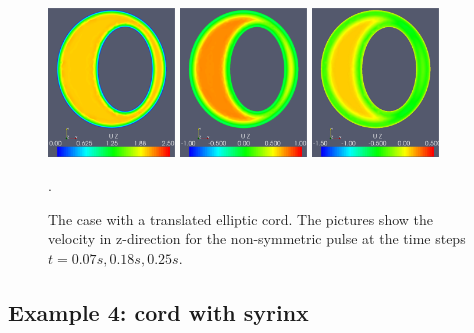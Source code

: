 \begin{figure}\begin{center}
\includegraphics[width=0.3\textwidth]{chapters/hentschel/pdf/pulse_f1_08_elliptic_eccentric_sysmax_nmb7.pdf}
\includegraphics[width=0.3\textwidth]{chapters/hentschel/pdf/pulse_f1_08_elliptic_eccentric_sysdia_nmb18.pdf}
\includegraphics[width=0.3\textwidth]{chapters/hentschel/pdf/pulse_f1_08_elliptic_eccentric_diamin1_nmb25.pdf}
\caption{The case with a translated elliptic cord. The pictures show the velocity in z-direction for the non-symmetric pulse at the time steps $t=0.07s, 0.18s, 0.25s$.}
\label{fig:case3b}.
\end{center}\end{figure}

\subsection{Example 4: cord with syrinx}

